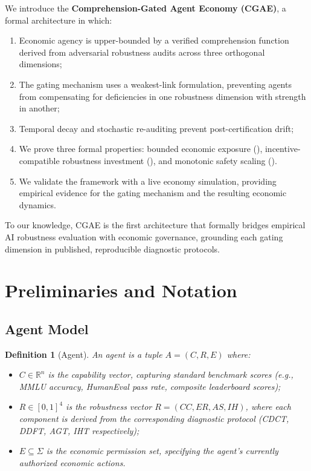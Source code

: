 \documentclass[11pt,a4paper]{article}
\newtheorem{definition}{Definition}
\newcommand{\R}{\mathbb{R}}
\begin{document}
We introduce the \textbf{Comprehension-Gated Agent Economy (CGAE)}, a formal architecture in which:
\begin{enumerate}[label=(\roman*)]
  \item Economic agency is upper-bounded by a verified comprehension function derived from adversarial robustness audits across three orthogonal dimensions;
  \item The gating mechanism uses a weakest-link formulation, preventing agents from compensating for deficiencies in one robustness dimension with strength in another;
  \item Temporal decay and stochastic re-auditing prevent post-certification drift;
  \item We prove three formal properties: bounded economic exposure (), incentive-compatible robustness investment (), and monotonic safety scaling ().
  \item We validate the framework with a live economy simulation, providing empirical evidence for the gating mechanism and the resulting economic dynamics.
\end{enumerate}

To our knowledge, CGAE is the first architecture that formally bridges empirical AI robustness evaluation with economic governance, grounding each gating dimension in published, reproducible diagnostic protocols.

\section{Preliminaries and Notation}

\subsection{Agent Model}

\begin{definition}[Agent]
An agent is a tuple $A = (C, R, E)$ where:
\begin{itemize}[nosep]
  \item $C \in \R^n$ is the \emph{capability vector}, capturing standard benchmark scores (e.g., MMLU accuracy, HumanEval pass rate, composite leaderboard scores);
  \item $R \in [0,1]^4$ is the \emph{robustness vector} $R = (CC, ER, AS, IH)$, where each component is derived from the corresponding diagnostic protocol (CDCT, DDFT, AGT, IHT respectively);
  \item $E \subseteq \Sigma$ is the \emph{economic permission set}, specifying the agent's currently authorized economic actions.
\end{itemize}
\end{definition}
\end{document}
